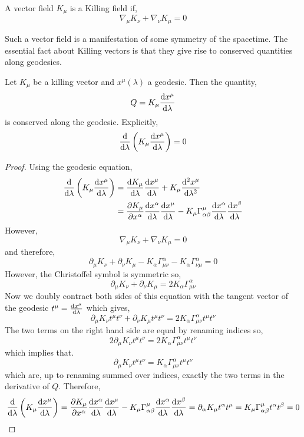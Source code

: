 \documentclass[11pt, a4paper]{article}
\begin{document}
\begin{definition}
A vector field $K_\mu$ is a Killing field if,
\[ \nabla_{\mu} K_\nu + \nabla_{\nu} K_{\mu} = 0 \]
\end{definition}
Such a vector field is a manifestation of some symmetry of the spacetime. The essential fact about Killing vectors is that they give rise to conserved quantities along geodesics.

\begin{theorem}
Let $K_\mu$ be a killing vector and $x^{\mu}(\lambda)$ a geodesic. Then the quantity,
\[ Q = K_\mu \frac{\mathrm{d}x^{\mu}}{\mathrm{d}\lambda}\]
is conserved along the geodesic. Explicitly,
\[ \frac{\mathrm{d}}{\mathrm{d}\lambda} \left( K_\mu \frac{\mathrm{d}x^{\mu}}{\mathrm{d}\lambda} \right) = 0\]
\end{theorem}

\begin{proof}
Using the geodesic equation,
\begin{align*}
\frac{\mathrm{d}}{\mathrm{d}\lambda} \left( K_\mu \frac{\mathrm{d}x^{\mu}}{\mathrm{d}\lambda} \right) & = \frac{\mathrm{d}K_\mu}{\mathrm{d}\lambda} \frac{\mathrm{d}x^{\mu}}{\mathrm{d}\lambda} + K_\mu \frac{\mathrm{d}^{2} x^{\mu}}{\mathrm{d}\lambda^{2}} 
\\
& = \frac{\partial{K_\mu}}{\partial{x^{\alpha}}} \frac{\mathrm{d}x^{\alpha}}{\mathrm{d}\lambda} \frac{\mathrm{d}x^{\mu}}{\mathrm{d}\lambda} - K_\mu \Gamma^{\mu}_{\alpha \beta} \frac{\mathrm{d}x^\alpha}{\mathrm{d}\lambda} \frac{\mathrm{d}x^\beta}{\mathrm{d}\lambda}
\end{align*}
However,
\[ \nabla_{\mu} K_\nu + \nabla_{\nu} K_{\mu} = 0 \]
and therefore,
\[ \partial_{\mu} K_\nu + \partial_{\nu} K_{\mu} - K_{\alpha} \Gamma^{\alpha}_{\mu \nu} - K_{\alpha} \Gamma^{\alpha}_{\nu \mu} = 0 \]
However, the Christoffel symbol is symmetric so,
\[ \partial_{\mu} K_\nu + \partial_{\nu} K_{\mu} = 2 K_{\alpha} \Gamma^{\alpha}_{\mu \nu} \]
Now we doubly contract both sides of this equation with the tangent vector of the geodesic $t^\mu = \frac{\mathrm{d}x^\mu}{\mathrm{d}\lambda}$ which gives,
\[ \partial_\mu K_\nu t^\mu t^\nu + \partial_{\nu} K_{\mu} t^\mu t^\nu = 2 K_{\alpha} \Gamma^{\alpha}_{\mu \nu} t^{\mu} t^{\nu} \]
The two terms on the right hand side are equal by renaming indices so,
\[ 2 \partial_\mu K_\nu t^\mu t^\nu = 2 K_{\alpha} \Gamma^{\alpha}_{\mu \nu} t^{\mu} t^{\nu} \]
which implies that.
\[ \partial_{\mu} K_{\nu} t^\mu t^\nu = K_{\alpha} \Gamma^{\alpha}_{\mu \nu} t^\mu t^\nu \]
which are, up to renaming summed over indices, exactly the two terms in the derivative of $Q$. Therefore,
\[ \frac{\mathrm{d}}{\mathrm{d}\lambda} \left( K_\mu \frac{\mathrm{d}x^{\mu}}{\mathrm{d}\lambda} \right) = \frac{\partial{K_\mu}}{\partial{x^{\alpha}}} \frac{\mathrm{d}x^{\alpha}}{\mathrm{d}\lambda} \frac{\mathrm{d}x^{\mu}}{\mathrm{d}\lambda} - K_\mu \Gamma^{\mu}_{\alpha \beta} \frac{\mathrm{d}x^\alpha}{\mathrm{d}\lambda} \frac{\mathrm{d}x^\beta}{\mathrm{d}\lambda} = \partial_{\alpha} K_{\mu} t^\alpha t^\mu = K_{\mu} \Gamma^{\mu}_{\alpha \beta} t^\alpha t^\beta = 0\]
\end{proof}
\end{document}
